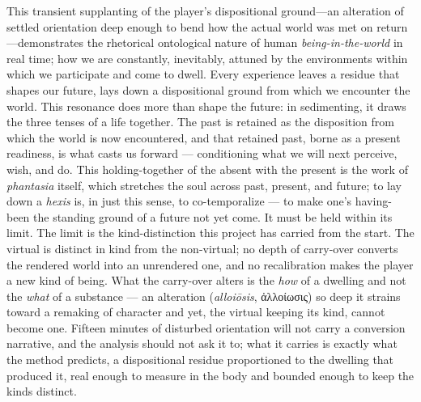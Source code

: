 \documentclass{article}
\newcommand{\gk}[1]{{\greekfont #1}}
\begin{document}
This transient supplanting of the player's dispositional ground---an alteration of settled orientation deep enough to bend how the actual world was met on return---demonstrates the rhetorical ontological nature of human \textit{being-in-the-world} in real time; how we are constantly, inevitably, attuned by the environments within which we participate and come to dwell. Every experience leaves a residue that shapes our future, lays down a dispositional ground from which we encounter the world. This resonance does more than shape the future: in sedimenting, it draws the three tenses of a life together. The past is retained as the disposition from which the world is now encountered, and that retained past, borne as a present readiness, is what casts us forward — conditioning what we will next perceive, wish, and do. This holding-together of the absent with the present is the work of \textit{phantasia} itself, which stretches the soul across past, present, and future; to lay down a \textit{hexis} is, in just this sense, to co-temporalize — to make one's having-been the standing ground of a future not yet come. It must be held within its limit. The limit is the kind-distinction this project has carried from the start. The virtual is distinct in kind from the non-virtual; no depth of carry-over converts the rendered world into an unrendered one, and no recalibration makes the player a new kind of being. What the carry-over alters is the \textit{how} of a dwelling and not the \textit{what} of a substance — an alteration (\textit{alloiōsis}, \gk{ἀλλοίωσις}) so deep it strains toward a remaking of character and yet, the virtual keeping its kind, cannot become one. Fifteen minutes of disturbed orientation will not carry a conversion narrative, and the analysis should not ask it to; what it carries is exactly what the method predicts, a dispositional residue proportioned to the dwelling that produced it, real enough to measure in the body and bounded enough to keep the kinds distinct.
\end{document}
